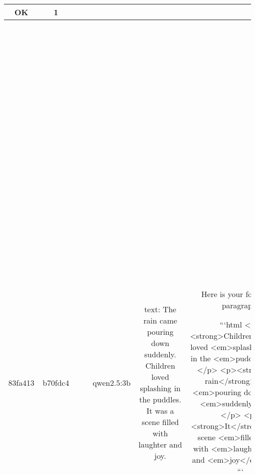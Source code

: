 \begin{table}[h!]
\begin{tabular}{|c|c|c|c|c|c|c|c|c|c|}
OK & 1\\
\hline
83fa413 & b70fdc4 &  &  & qwen2.5:3b & text: The rain came pouring down suddenly. Children loved splashing in the puddles. It was a scene filled with laughter and joy. & Here is your formatted paragraph:

```html
<p><strong>Children</strong> loved <em>splashing</em> in the <em>puddles</em>.</p>
<p><strong>The rain</strong> came <em>pouring down</em> <em>suddenly</em>.</p>
<p><strong>It</strong> was a scene <em>filled</em> with <em>laughter</em> and <em>joy</em>.</p>
``` & ok & The chatbot's output consists of three HTML paragraph tags `<p>`, each containing a sentence. Each `<p>` tag contains a `<strong>` tag to emphasize a single word and multiple `<em>` tags to highlight key words or phrases. This aligns with the requirement to split a paragraph into individual sentences, wrap each in a `<p>` tag, and include one `<strong>` tag and multiple `<em>` tags in each paragraph. The description specifies that there should be at least three `<p>` tags, which is met in this output. Therefore, the output is compliant with the description.

No violation.
OK & 1\\
\hline
9c76922 & b70fdc4 &  &  & qwen2.5:3b & text: Spring is the season of renewal. Flowers bloom and trees regain their leaves. It's a time of growth and new beginnings. & ```html
<p><strong>Spring</strong> is the season of <em>renewal</em>.<br></p>
<p>Flowers <strong>bloom</strong> and trees regain their <em>leaves</em>.<br></p>
<p>It's a time of <strong>growth</strong> and new <em>beginnings</em>.</p>
``` & ok & The chatbot output consists of three <p> tags, each containing a sentence, which satisfies the requirement of having at least three <p> tags with each sentence wrapped in a separate <p> tag. In each <p> tag, there is one <strong> tag, and there are multiple <em> tags, which fulfills the requirement of having one <strong> tag and multiple <em> tags to emphasize key words and phrases. Therefore, the output complies with the description provided.

No violation.
OK & 1\\
\hline
60fc020 & b70fdc4 &  &  & qwen2.5:3b & text: Travel opens up new perspectives. It allows learning about different cultures. Explorers have been doing it for centuries. & ```
<p><strong>Travel</strong> opens up <em>new perspectives</em>. It allows learning about <em>different</em> <em>cultures</em>. Explorers have been <em>doing</em> <em>it</em> for centuries.</p>
``` & err & The output has been evaluated for compliance based on the given description:


\end{tabular}
\end{table}
